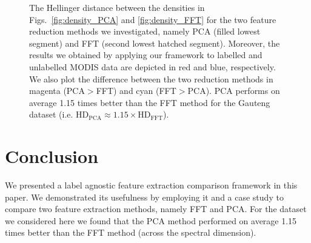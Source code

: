 \documentclass{article}
\begin{document}
% 
% 
% 

\begin{figure}[h]
\begin{minipage}[b]{0.9\linewidth}
   \centering
   \centerline{}
 \end{minipage}
 \caption{The Hellinger distance between the densities in Figs.~\ref{fig:density_PCA} and \ref{fig:density_FFT} for the two feature reduction methods we investigated, namely PCA (filled lowest segment) and FFT (second lowest hatched segment).
 Moreover, the results we obtained by applying our framework to labelled and unlabelled MODIS data are depicted in red and blue, respectively.  
 We also plot the difference between the two reduction methods in magenta (PCA$>$FFT) and cyan (FFT$>$PCA). 
 PCA performs on average 1.15 times better than the FFT method for the Gauteng dataset (i.e. $\textrm{HD}_{\textrm{PCA}} \approx 1.15\times \textrm{HD}_{\textrm{FFT}}$).}
\label{fig:HD}
\end{figure}

\section{Conclusion}
\label{sec:ref}
We presented a label agnostic feature extraction comparison framework in this paper. We demonstrated its usefulness by employing it and a case study to compare two feature extraction methods,
namely FFT and PCA. For the dataset we considered here we found that the PCA method performed on average 1.15 times better than the FFT method (across the spectral dimension).




\end{document}
